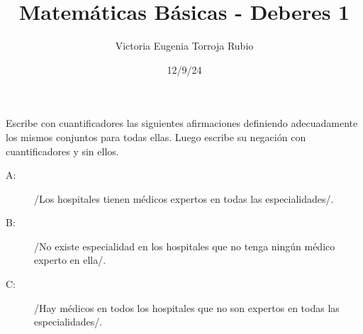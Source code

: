 \documentclass{article}
\begin{document}
\title{Matemáticas Básicas - Deberes 1}
\author{Victoria Eugenia Torroja Rubio}
\date{12/9/24}

\maketitle

\begin{ej}
Escribe con cuantificadores las siguientes afirmaciones definiendo adecuadamente los mismos conjuntos para todas ellas. Luego escribe su negación con cuantificadores y sin ellos. 
\begin{description}
\item[A:] /Los hospitales tienen médicos expertos en todas las especialidades/.
\item[B:] /No existe especialidad en los hospitales que no tenga ningún médico experto en ella/.
\item[C:] /Hay médicos en todos los hospitales que no son expertos en todas las especialidades/.
\end{description}
\end{ej}
\end{document}
